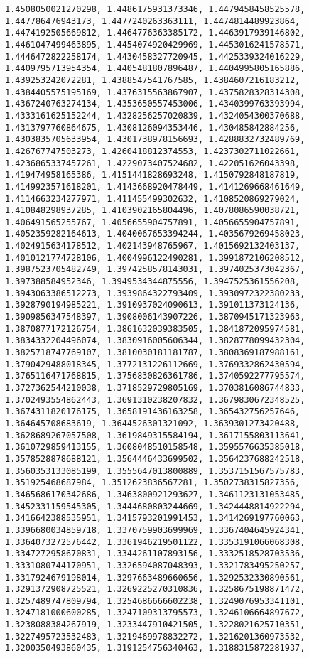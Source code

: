 \documentclass[11pt]{article}
\begin{document}
\begin{Verbatim}[commandchars=\\\{\}]
1.4508050021270298, 1.4486175931373346, 1.4479458458525578, 1.447786476943173, 1.4477240263363111, 1.4474814489923864, 1.4474192505669812, 1.4464776363385172, 1.4463917939146802, 1.4461047499463895, 1.4454074920429969, 1.4453016241578571, 1.4446472822258174, 1.4430458327720945, 1.4425339324016229, 1.4409795713954354, 1.4405481807896487, 1.4404995805165886, 1.439253242072281, 1.4388547541767585, 1.4384607216183212, 1.4384405575195169, 1.4376315563867907, 1.4375828328314308, 1.4367240763274134, 1.4353650557453006, 1.4340399763393994, 1.4333161625152244, 1.4328256257020839, 1.4324054300370688, 1.4313797760864675, 1.4308126094353446, 1.430485842884256, 1.4303835705633954, 1.4301738978156693, 1.4288832732489769, 1.426767747503273, 1.4260418812374553, 1.4237302711022661, 1.4236865337457261, 1.4229073407524682, 1.422051626043398, 1.419474958165386, 1.4151441828693248, 1.4150792848187819, 1.4149923571618201, 1.4143668920478449, 1.4141269668461649, 1.4114663234277971, 1.411455499302632, 1.4108520869279024, 1.410848298937285, 1.4103902165804496, 1.4078086590038721, 1.406491565255767, 1.4056655904757891, 1.4056655904757891, 1.4052359282164613, 1.4040067653394244, 1.4035679269458023, 1.4024915634178512, 1.402143948765967, 1.4015692132403137, 1.4010121774728106, 1.4004996122490281, 1.3991872106208512, 1.3987523705482749, 1.3974258578143031, 1.3974025373042367, 1.397388584952346, 1.3949534344875556, 1.3947525361556208, 1.3943063386512273, 1.3939864322793409, 1.3930972322380233, 1.3928790194985221, 1.3910937024090613, 1.391011373124136, 1.3909856347548397, 1.3908006143907226, 1.3870945171323963, 1.3870877172126754, 1.3861632039383505, 1.3841872095974581, 1.3834332204496074, 1.3830916005606344, 1.3828778099432304, 1.3825718747769107, 1.3810030181181787, 1.3808369187988161, 1.3790429488018345, 1.3772131226112669, 1.3769332862430594, 1.3765116471768815, 1.3756830826361786, 1.3740592277795574, 1.3727362544210038, 1.3718529729805169, 1.3703816086744833, 1.3702493554862443, 1.3691310238207832, 1.3679830672348525, 1.3674311820176175, 1.3658191436163258, 1.365432756257646, 1.364645708683619, 1.3644526301321092, 1.3639301273420488, 1.3628689267057508, 1.3619849315584194, 1.3617155803113641, 1.3610729859413155, 1.3608048510158548, 1.3595576635385018, 1.3578528878688121, 1.3564446433699502, 1.3564237688242518, 1.3560353133085199, 1.3555647013800889, 1.3537151567575783, 1.351925468687984, 1.3512623836567281, 1.3502738315827356, 1.3465686170342686, 1.3463800921293627, 1.3461123131053485, 1.3452331159545305, 1.3444680803244669, 1.3424448814922294, 1.3416642388535951, 1.3415793201991453, 1.3414269197760063, 1.3396680034859718, 1.3370759903699969, 1.3367404645924341, 1.3364073272576442, 1.3361946219501122, 1.3353191066068308, 1.3347272958670831, 1.3344261107893156, 1.3332518528703536, 1.3331080744170951, 1.3326594087048393, 1.3321783495250257, 1.3317924679198014, 1.3297663489660656, 1.3292532330890561, 1.3291372908725521, 1.3269225270310836, 1.3258675198871472, 1.3257489747809794, 1.3254686666602238, 1.3249076953341101, 1.3247181000600285, 1.3247109313795573, 1.3246106664897672, 1.3238088384267919, 1.3233447910421505, 1.3228021625710351, 1.3227495723532483, 1.3219469978832272, 1.3216201360973532, 1.3200350493860435, 1.3191254756340463, 1.3188315872281937, 
\end{Verbatim}
\end{document}
